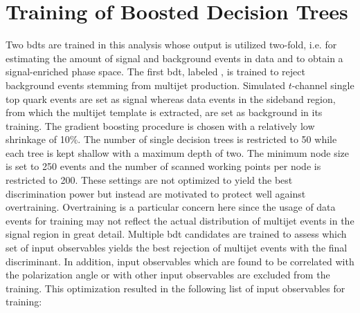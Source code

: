 


\section{Training of Boosted Decision Trees}
\label{sec:polarization-bdt-training}

Two \glspl{bdt} are trained in this analysis whose output is utilized two-fold, i.e. for estimating the amount of signal and background events in data and to obtain a signal-enriched phase space. The first \gls{bdt}, labeled \bdtqcd, is trained to reject background events stemming from multijet production. Simulated $t$-channel single top quark events are set as signal whereas data events in the sideband region, from which the multijet template is extracted, are set as background in its training. The gradient boosting procedure is chosen with a relatively low shrinkage of 10\%. The number of single decision trees is restricted to 50 while each tree is kept shallow with a maximum depth of two. The minimum node size is set to 250 events and the number of scanned working points per node is restricted to 200. These settings are not optimized to yield the best discrimination power but instead are motivated to protect well against overtraining. Overtraining is a particular concern here since the usage of data events for training may not reflect the actual distribution of multijet events in the signal region in great detail. Multiple \gls{bdt} candidates are trained to assess which set of input observables yields the best rejection of multijet events with the final discriminant. In addition, input observables which are found to be correlated with the polarization angle or with other input observables are excluded from the training. This optimization resulted in the following list of input observables for training:

